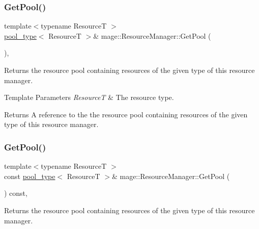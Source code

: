 \subsubsection{\texorpdfstring{Get\+Pool()}{GetPool()}\hspace{0.1cm}{\footnotesize\ttfamily [1/2]}}
{\footnotesize\ttfamily template$<$typename ResourceT $>$ \\
\hyperlink{classmage_1_1_resource_manager_a4416f0a710790d8aa2d0bc006764695a}{pool\+\_\+type}$<$ ResourceT $>$\& mage\+::\+Resource\+Manager\+::\+Get\+Pool (\begin{DoxyParamCaption}{ }\end{DoxyParamCaption})\hspace{0.3cm}{\ttfamily [private]}, {\ttfamily [noexcept]}}

Returns the resource pool containing resources of the given type of this resource manager.


\begin{DoxyTemplParams}{Template Parameters}
{\em ResourceT} & The resource type. \\
\hline
\end{DoxyTemplParams}
\begin{DoxyReturn}{Returns}
A reference to the the resource pool containing resources of the given type of this resource manager. 
\end{DoxyReturn}
\hypertarget{classmage_1_1_resource_manager_af0e98b448cddce09b1026fb38c4ab923}{}\label{classmage_1_1_resource_manager_af0e98b448cddce09b1026fb38c4ab923} 
\subsubsection{\texorpdfstring{Get\+Pool()}{GetPool()}\hspace{0.1cm}{\footnotesize\ttfamily [2/2]}}
{\footnotesize\ttfamily template$<$typename ResourceT $>$ \\
const \hyperlink{classmage_1_1_resource_manager_a4416f0a710790d8aa2d0bc006764695a}{pool\+\_\+type}$<$ ResourceT $>$\& mage\+::\+Resource\+Manager\+::\+Get\+Pool (\begin{DoxyParamCaption}{ }\end{DoxyParamCaption}) const\hspace{0.3cm}{\ttfamily [private]}, {\ttfamily [noexcept]}}

Returns the resource pool containing resources of the given type of this resource manager.


